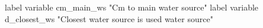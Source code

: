 label variable cm_main_ws "Cm to main water source"
label variable d_closest_ws "Closest water source is used water source" 
